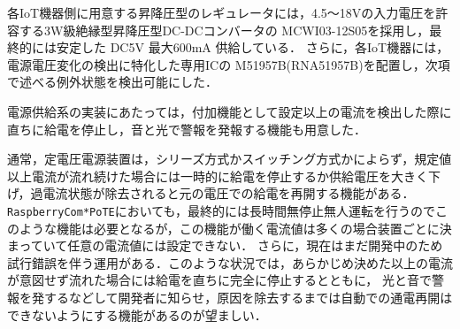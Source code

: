 
各IoT機器側に用意する昇降圧型のレギュレータには，4.5〜18Vの入力電圧を許容する3W級絶縁型昇降圧型DC-DCコンバータの MCWI03-12S05\cite{data:MCWI03-12S05}を採用し，最終的には安定した DC5V 最大600mA 供給している．
さらに，各IoT機器には，電源電圧変化の検出に特化した専用ICの M51957B(RNA51957B)\cite{data:M51957B}を配置し，次項で述べる例外状態を検出可能にした．






電源供給系の実装にあたっては，付加機能として設定以上の電流を検出した際に直ちに給電を停止し，音と光で警報を発報する機能も用意した．

通常，定電圧電源装置は，シリーズ方式かスイッチング方式かによらず，規定値以上電流が流れ続けた場合には一時的に給電を停止するか供給電圧を大きく下げ，過電流状態が除去されると元の電圧での給電を再開する機能がある．
{\tt Raspberry\-Com*PoTE}においても，最終的には長時間無停止無人運転を行うのでこのような機能は必要となるが，この機能が働く電流値は多くの場合装置ごとに決まっていて任意の電流値には設定できない．
さらに，現在はまだ開発中のため試行錯誤を伴う運用がある．このような状況では，あらかじめ決めた以上の電流が意図せず流れた場合には給電を直ちに完全に停止するとともに，
光と音で警報を発するなどして開発者に知らせ，原因を除去するまでは自動での通電再開はできないようにする機能があるのが望ましい．

